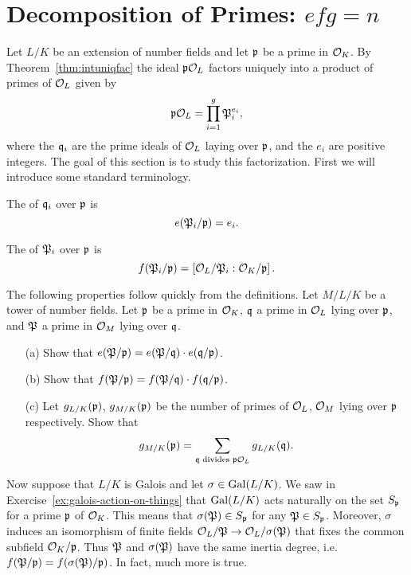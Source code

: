 \section{Decomposition of Primes: $efg=n$}

Let $L/K$ be an extension of number fields and let $\p$ be a prime
in $\O_K$. By Theorem~\ref{thm:intuniqfac} the ideal $\p\O_L$ factors
uniquely into a product of primes of $\O_L$ given by
$$
	\p\O_L = \prod_{i=1}^g \P^{e_i}_i,
$$
where the $\q_i$ are the prime ideals of $\O_L$ laying over $\p$, and
the $e_i$ are positive integers. The goal of this section is to study this
factorization. First we will introduce some standard terminology.

\begin{definition}
	The  of $\q_i$ over $\p$ is
	$$
		e(\P_i/\p) = e_i.
	$$
\end{definition}

\begin{definition}
	The 
	of $\P_i$ over $\p$ is
	$$
		f(\P_i/\p) = \left[\O_L/\P_i : \O_K/\p\right].
	$$
\end{definition}

\begin{exercise}\label{ex:ramificationmultiplicative}
	The following properties follow quickly from the definitions.
	Let $M/L/K$ be a tower of number fields. Let $\p$ be a prime
	in $\O_K$, $\q$ a prime in $\O_L$ lying over $\p$, and $\P$ a prime
	in $\O_M$ lying over $\q$.
	\begin{enumerate}
		\item[(a)] Show that $e(\P/\p)=e(\P/\q) \cdot e(\q/\p)$.
		
		\item[(b)] Show that $f(\P/\p)=f(\P/\q) \cdot f(\q/\p)$.
		
		\item[(c)] Let $g_{L/K}(\p)$, $g_{M/K}(\p)$ be the number of primes
		of $\O_L$, $\O_M$ lying over $\p$ respectively. Show that
		$$
			g_{M/K}(\p) = \sum\limits_{\q \text{ divides } \p\O_L} g_{L/K}(\q).
		$$
	\end{enumerate}
\end{exercise}


Now suppose that $L/K$ is Galois and let $\sigma\in\Gal(L/K)$.
We saw in Exercise~\ref{ex:galois-action-on-things} that $\Gal(L/K)$ acts
naturally on the set $S_\p$ for a prime $\p$ of $\O_K$.
This means that $\sigma(\P) \in S_\p$ for any $\P \in S_\p$. Moreover,
$\sigma$ induces an isomorphism of finite fields $\O_L/\P\to \O_L/\sigma(\P)$
that fixes the common subfield $\O_K/\p$. Thus $\P$ and $\sigma(\P)$ have
the same inertia degree, i.e. $f(\P/\p) = f(\sigma(\P)/\p)$.
In fact, much more is true.





